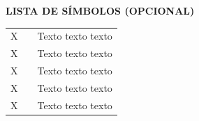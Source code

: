 
\begin{center}
    \textbf{LISTA DE SÍMBOLOS  (OPCIONAL)}
    \vspace{1cm}
\end{center}

\begin{table}[h]
    \begin{tabular}{lcl}
        X & \hspace{0.5cm} & Texto texto texto \\
        X & \hspace{0.5cm} & Texto texto texto \\
        X & \hspace{0.5cm} & Texto texto texto \\
        X & \hspace{0.5cm} & Texto texto texto \\
        X & \hspace{0.5cm} & Texto texto texto
    \end{tabular}
\end{table}